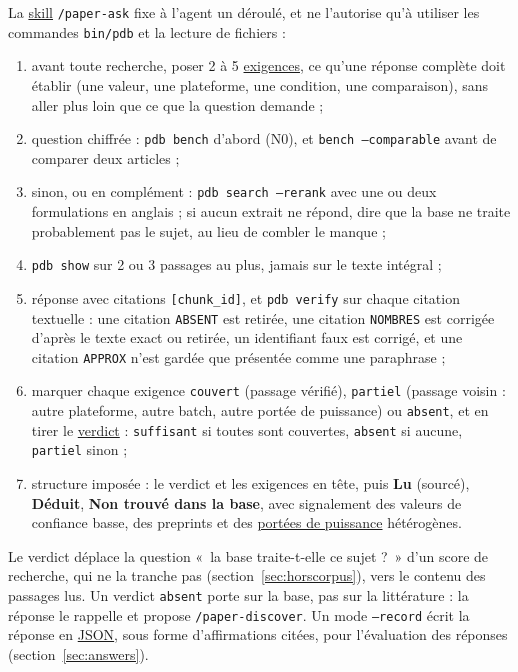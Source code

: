 \documentclass[11pt,a4paper]{article}
\newcommand{\cmd}[1]{\texttt{#1}}
\newcommand{\gl}[2]{\hyperlink{gl:#1}{\textcolor{glcolor}{#2}}}
\begin{document}
La \gl{skill}{skill} \cmd{/paper-ask} fixe à l'agent un déroulé, et ne l'autorise qu'à utiliser les
commandes \cmd{bin/pdb} et la lecture de fichiers :
\begin{enumerate}
  \item avant toute recherche, poser 2 à 5 \gl{exigence}{exigences}, ce qu'une réponse complète doit
    établir (une valeur, une plateforme, une condition, une comparaison), sans aller plus
    loin que ce que la question demande ;
  \item question chiffrée : \cmd{pdb bench} d'abord (N0), et \cmd{bench --comparable} avant
    de comparer deux articles ;
  \item sinon, ou en complément : \cmd{pdb search --rerank} avec une ou deux formulations
    en anglais ; si aucun extrait ne répond, dire que la base ne traite probablement pas
    le sujet, au lieu de combler le manque ;
  \item \cmd{pdb show} sur 2 ou 3 passages au plus, jamais sur le texte intégral ;
  \item réponse avec citations \cmd{[chunk\_id]}, et \cmd{pdb verify} sur chaque citation
    textuelle : une citation \cmd{ABSENT} est retirée, une citation \cmd{NOMBRES} est
    corrigée d'après le texte exact ou retirée, un identifiant faux est corrigé, et une
    citation \cmd{APPROX} n'est gardée que présentée comme une paraphrase ;
  \item marquer chaque exigence \cmd{couvert} (passage vérifié), \cmd{partiel} (passage
    voisin : autre plateforme, autre batch, autre portée de puissance) ou \cmd{absent}, et en
    tirer le \gl{verdict}{verdict} : \cmd{suffisant} si toutes sont couvertes, \cmd{absent} si aucune,
    \cmd{partiel} sinon ;
  \item structure imposée : le verdict et les exigences en tête, puis \textbf{Lu} (sourcé),
    \textbf{Déduit}, \textbf{Non trouvé dans la base}, avec signalement des valeurs de
    confiance basse, des preprints et des \gl{scope}{portées de puissance} hétérogènes.
\end{enumerate}
Le verdict déplace la question «~la base traite-t-elle ce sujet ?~» d'un score de recherche,
qui ne la tranche pas (section~\ref{sec:horscorpus}), vers le contenu des passages lus. Un
verdict \cmd{absent} porte sur la base, pas sur la littérature : la réponse le rappelle et
propose \cmd{/paper-discover}. Un mode \cmd{--record} écrit la réponse en \gl{JSON}{JSON}, sous forme
d'affirmations citées, pour l'évaluation des réponses (section~\ref{sec:answers}).
\end{document}
